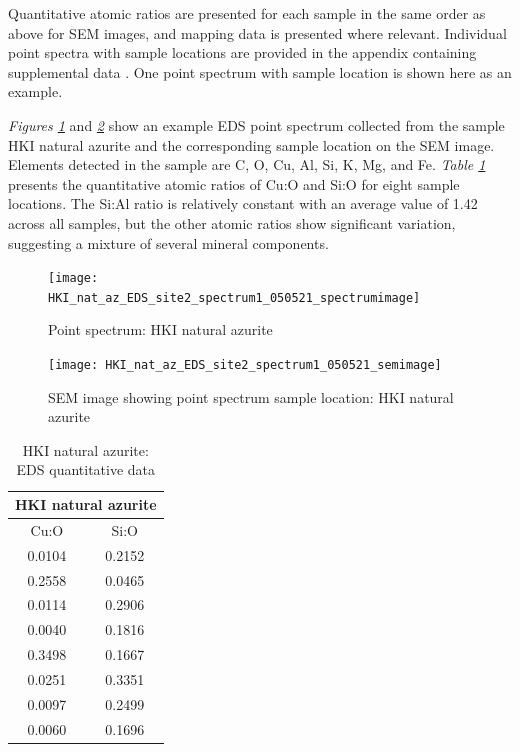 Quantitative atomic ratios are presented for each sample in the same order as above for SEM images, and mapping data is presented where relevant. Individual point spectra with sample locations are provided in the appendix containing supplemental data . One point spectrum with sample location is shown here as an example.

\textit{Figures \ref{fig:hki_eds_spectrum}} and \textit{\ref{fig:hki_eds_sem_image}} show an example EDS point spectrum collected from the sample HKI natural azurite and the corresponding sample location on the SEM image. Elements detected in the sample are C, O, Cu, Al, Si, K, Mg, and Fe. \textit{Table \ref{table:hki_ratios}} presents the quantitative atomic ratios of Cu:O and Si:O for eight sample locations. The Si:Al ratio is relatively constant with an average value of 1.42 across all samples, but the other atomic ratios show significant variation, suggesting a mixture of several mineral components.

\begin{figure}[H]
\centering
  \texttt{[image: HKI\_nat\_az\_EDS\_site2\_spectrum1\_050521\_spectrumimage]}
\caption[Point spectrum: HKI natural azurite]{Point spectrum: HKI natural azurite}
\label{fig:hki_eds_spectrum}
\end{figure}

\begin{figure}[H]
\centering
  \texttt{[image: HKI\_nat\_az\_EDS\_site2\_spectrum1\_050521\_semimage]}
\caption[SEM image showing point spectrum sample location: HKI natural azurite]{SEM image showing point spectrum sample location: HKI natural azurite}
\label{fig:hki_eds_sem_image}
\end{figure}

\begin{table}[H]
\caption{HKI natural azurite: EDS quantitative data}
\centering
\label{table:hki_ratios}
\begin{tabular}{c c}
\toprule
\multicolumn{2}{c}{HKI natural azurite} \\
\midrule
Cu:O & Si:O \\
\midrule
0.0104 & 0.2152 \\
0.2558 & 0.0465 \\
0.0114 & 0.2906 \\
0.0040 & 0.1816 \\
0.3498 & 0.1667 \\
0.0251 & 0.3351  \\
0.0097 & 0.2499 \\
0.0060 & 0.1696 \\
\bottomrule
\end{tabular}
\end{table}

